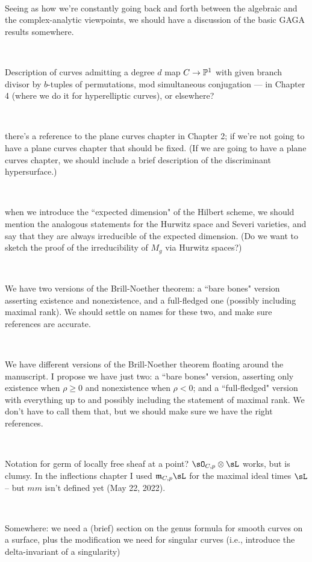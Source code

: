 \documentclass[12pt, leqno]{book}
\begin{document}
\

Seeing as how we're constantly going back and forth between the algebraic and the complex-analytic viewpoints,  we should have a discussion of the basic GAGA results somewhere.

\

Description of curves admitting a degree $d$ map $C \to \PP^1$ with given branch divisor by $b$-tuples of permutations, mod simultaneous conjugation --- in Chapter 4 (where we do it for hyperelliptic curves), or elsewhere?

\

there's a reference to the plane curves chapter in Chapter 2; if we're not going to have a plane curves chapter that should be fixed. (If we are going to have a plane curves chapter, we should include a brief description of the discriminant hypersurface.)

\

when we introduce the ``expected dimension" of the Hilbert scheme, we should mention the analogous statements for the Hurwitz space and Severi varieties, and say that they are always irreducible of the expected dimension. (Do we want to sketch the proof of the irreducibility of $M_g$ via Hurwitz spaces?)

\

We have two versions of the Brill-Noether theorem: a ``bare bones" version asserting existence and nonexistence, and a full-fledged one (possibly including maximal rank). We should settle on names for these two, and make sure references are accurate.

\

We have different versions of the Brill-Noether theorem floating around the manuscript. I propose we have just two: a ``bare bones" version, asserting only existence when $\rho \geq 0$ and nonexistence when $\rho < 0$; and a ``full-fledged" version with everything up to and possibly including the statement of maximal rank. We don't have to call them that, but we should make sure we have the right references. 


\ 

Notation for germ of locally free sheaf at a point? $\sO_{C,p}\otimes \sL$ works, but is clumsy. In the inflections chapter I used $\frak{m}_{C,p}\sL$ for the maximal ideal times $\sL$ -- but $mm$ isn't defined yet (May 22, 2022).

\

Somewhere: we need a (brief) section on the genus formula for smooth curves on a surface, plus the modification we need for singular curves (i.e., introduce the delta-invariant of a singularity)
\end{document}
